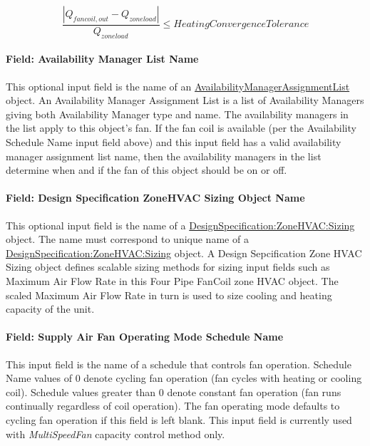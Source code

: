 \begin{equation}
\frac{{\left| {{Q_{fancoil,out}} - {Q_{zoneload}}} \right|}}{{{Q_{zoneload}}}} \le HeatingConvergenceTolerance
\end{equation}

\paragraph{Field: Availability Manager List Name}\label{field-availability-manager-list-name-002}

This optional input field is the name of an \hyperref[availabilitymanagerassignmentlist]{AvailabilityManagerAssignmentList} object. An Availability Manager Assignment List is a list of Availability Managers giving both Availability Manager type and name. The availability managers in the list apply to this object's fan. If the fan coil is available (per the Availability Schedule Name input field above) and this input field has a valid availability manager assignment list name, then the availability managers in the list determine when and if the fan of this object should be on or off.

\paragraph{Field: Design Specification ZoneHVAC Sizing Object Name}\label{field-design-specification-zonehvac-sizing-object-name-1}

This optional input field is the name of a \hyperref[designspecificationzonehvacsizing]{DesignSpecification:ZoneHVAC:Sizing} object. The name must correspond to unique name of a \hyperref[designspecificationzonehvacsizing]{DesignSpecification:ZoneHVAC:Sizing} object. A Design Sepcification Zone HVAC Sizing object defines scalable sizing methods for sizing input fields such as Maximum Air Flow Rate in this Four Pipe FanCoil zone HVAC object. The scaled Maximum Air Flow Rate in turn is used to size cooling and heating capacity of the unit.

\paragraph{Field: Supply Air Fan Operating Mode Schedule Name}\label{field-supply-air-fan-operating-mode-schedule-name-000}

This input field is the name of a schedule that controls fan operation. Schedule Name values of 0 denote cycling fan operation (fan cycles with heating or cooling coil). Schedule values greater than 0 denote constant fan operation (fan runs continually regardless of coil operation). The fan operating mode defaults to cycling fan operation if this field is left blank. This input field is currently used with \emph{MultiSpeedFan} capacity control method only.


